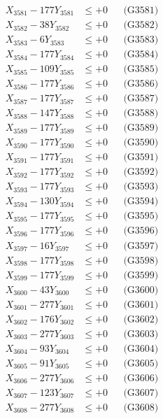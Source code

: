 \documentclass[a4paper,10pt]{article}
\begin{document}
{\begin{align}
\allowbreak
X_{3581} - 177Y_{3581} &\leq +0 && \text{(G3581)} \\
X_{3582} - 38Y_{3582} &\leq +0 && \text{(G3582)} \\
X_{3583} - 6Y_{3583} &\leq +0 && \text{(G3583)} \\
X_{3584} - 177Y_{3584} &\leq +0 && \text{(G3584)} \\
X_{3585} - 109Y_{3585} &\leq +0 && \text{(G3585)} \\
X_{3586} - 177Y_{3586} &\leq +0 && \text{(G3586)} \\
X_{3587} - 177Y_{3587} &\leq +0 && \text{(G3587)} \\
X_{3588} - 147Y_{3588} &\leq +0 && \text{(G3588)} \\
X_{3589} - 177Y_{3589} &\leq +0 && \text{(G3589)} \\
X_{3590} - 177Y_{3590} &\leq +0 && \text{(G3590)} \\
\allowbreak
X_{3591} - 177Y_{3591} &\leq +0 && \text{(G3591)} \\
X_{3592} - 177Y_{3592} &\leq +0 && \text{(G3592)} \\
X_{3593} - 177Y_{3593} &\leq +0 && \text{(G3593)} \\
X_{3594} - 130Y_{3594} &\leq +0 && \text{(G3594)} \\
X_{3595} - 177Y_{3595} &\leq +0 && \text{(G3595)} \\
X_{3596} - 177Y_{3596} &\leq +0 && \text{(G3596)} \\
X_{3597} - 16Y_{3597} &\leq +0 && \text{(G3597)} \\
X_{3598} - 177Y_{3598} &\leq +0 && \text{(G3598)} \\
X_{3599} - 177Y_{3599} &\leq +0 && \text{(G3599)} \\
X_{3600} - 43Y_{3600} &\leq +0 && \text{(G3600)} \\
\allowbreak
X_{3601} - 277Y_{3601} &\leq +0 && \text{(G3601)} \\
X_{3602} - 176Y_{3602} &\leq +0 && \text{(G3602)} \\
X_{3603} - 277Y_{3603} &\leq +0 && \text{(G3603)} \\
X_{3604} - 93Y_{3604} &\leq +0 && \text{(G3604)} \\
X_{3605} - 91Y_{3605} &\leq +0 && \text{(G3605)} \\
X_{3606} - 277Y_{3606} &\leq +0 && \text{(G3606)} \\
X_{3607} - 123Y_{3607} &\leq +0 && \text{(G3607)} \\
X_{3608} - 277Y_{3608} &\leq +0 && \text{(G3608)} \\

\end{align}}
\end{document}
